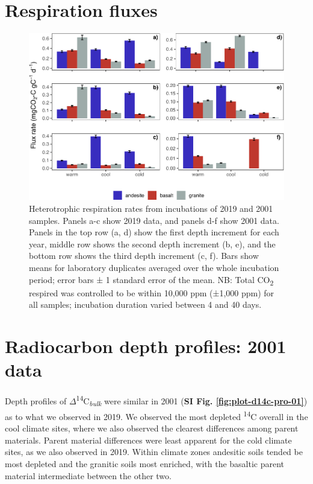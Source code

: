 \documentclass[english,man,floatsintext]{apa6}
\begin{document}
\hypertarget{respiration-fluxes}{%
\section{Respiration fluxes}\label{respiration-fluxes}}



\begin{figure}

{\centering \includegraphics{sra-blk-inc-SI_files/figure-latex/plot-cmtv-flx-rates-1} 

}

\caption{Heterotrophic respiration rates from incubations of 2019 and 2001 samples. Panels a-c show 2019 data, and panels d-f show 2001 data. Panels in the top row (a, d) show the first depth increment for each year, middle row shows the second depth increment (b, e), and the bottom row shows the third depth increment (c, f). Bars show means for laboratory duplicates averaged over the whole incubation period; error bars ± 1 standard error of the mean. NB: Total CO\textsubscript{2} respired was controlled to be within 10,000 ppm (±1,000 ppm) for all samples; incubation duration varied between 4 and 40 days.}\label{fig:plot-cmtv-flx-rates}
\end{figure}

\hypertarget{radiocarbon-depth-profiles-2001-data}{%
\section{Radiocarbon depth profiles: 2001 data}\label{radiocarbon-depth-profiles-2001-data}}

Depth profiles of \(\Delta\)\textsuperscript{14}C\textsubscript{\emph{bulk}} were similar in 2001 (\textbf{SI Fig. \ref{fig:plot-d14c-pro-01}}) as to what we observed in 2019. We observed the most depleted \textsuperscript{14}C overall in the cool climate sites, where we also observed the clearest differences among parent materials. Parent material differences were least apparent for the cold climate sites, as we also observed in 2019. Within climate zones andesitic soils tended be most depleted and the granitic soils most enriched, with the basaltic parent material intermediate between the other two.
\end{document}
